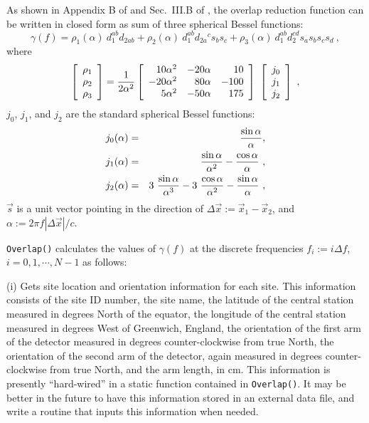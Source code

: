 \documentclass{article}
\begin{document}
As shown in Appendix B of \cite{flanagan} and Sec.~III.B of 
\cite{allenromano}, the overlap reduction function can be written in 
closed form as sum of three spherical Bessel functions:
%
\begin{equation}
\gamma(f)=\rho_1(\alpha)\ d_1^{ab}d_{2ab}
+\rho_2(\alpha)\ d_1^{ab}d_{2a}{}^c s_b s_c
+\rho_3(\alpha)\ d_1^{ab}d_2^{cd}s_a s_b s_c s_d\ ,
\label{e:closed1}
\end{equation}
%
where
%
\begin{equation}
\left[ 
\begin{array}{c}
\rho_1\\
\rho_2\\
\rho_3
\end{array}
\right]
=
{1\over 2\alpha^2}
\left[
\begin{array}{rrr}
 10\alpha^2 & -20\alpha   & 10\\
-20\alpha^2 &  80\alpha   & -100\\
  5\alpha^2 & -50\alpha   & 175
\end{array}
\right]\
\left[
\begin{array}{c}
j_0\\
j_1\\
j_2
\end{array}
\right]\ ,
\label{e:closed2}
\end{equation}
%
$j_0$, $j_1$, and $j_2$ are the standard spherical Bessel functions:
%
\begin{eqnarray}
j_0(\alpha)&=&{\sin\alpha\over\alpha} ,\nonumber\\ 
j_1(\alpha)&=&{\sin\alpha\over\alpha^2}-{\cos\alpha\over\alpha}\ ,
\label{e:closed3}\\ 
j_2(\alpha)&=&3\ {\sin\alpha\over\alpha^3}-3\ {\cos\alpha\over\alpha^2}
-{\sin\alpha\over\alpha}\ ,\nonumber
\end{eqnarray}
%
$\vec s$ is a unit vector pointing in the direction of 
$\Delta \vec x:=\vec x_1-\vec x_2$, and $\alpha:=2\pi f|\Delta\vec x|/c$.

{\tt Overlap()\/} calculates the values of $\gamma(f)$ at the discrete
frequencies $f_i:=i\Delta f$, $i=0,1,\cdots,N-1$ as follows:
%

(i) Gets site location and orientation information for each site.
This information consists of the site ID number, the site name, the 
latitude of the central station measured in degrees North of the 
equator, the longitude of the central station measured in degrees
West of Greenwich, England, the orientation of the first arm of
the detector measured in degrees counter-clockwise from true North,
the orientation of the second arm of the detector, again measured in 
degrees counter-clockwise from true North, and the arm length, in cm.
This information is presently ``hard-wired'' in a static function 
contained in {\tt Overlap()\/}.
It may be better in the future to have this information stored in
an external data file, and write a routine that inputs this information 
when needed.
\end{document}
